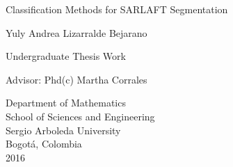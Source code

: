 \begin{titlepage}

  \begin{center}


    {\LARGE Classification Methods for SARLAFT Segmentation}

    \vspace*{\fill}

    {\large Yuly Andrea Lizarralde Bejarano}

    \vspace*{\fill}

    {\large Undergraduate Thesis Work}

    \vspace*{\fill}

    {\large Advisor:}
    {\large Phd(c) Martha Corrales}


    \vspace*{\fill}

    {\large Department of Mathematics}\\
    {\large School of Sciences and Engineering }\\
    {\large Sergio Arboleda University }\\
    {\large Bogot\'a, Colombia}\\
    {\large 2016}

  \end{center}

\end{titlepage}

